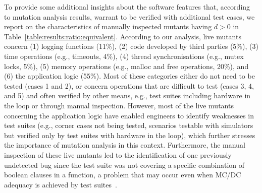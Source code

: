 To provide some additional insights about the software features that, according to \APPR mutation analysis results,
warrant to be verified with additional test cases, we report on the characteristics of
manually inspected mutants having $d > 0$ in Table~\ref{table:results:ratio:equivalent}.
According to our analysis, live mutants concern (1) logging functions (11\%),  (2) code developed by third parties (5\%), (3) time operations (e.g., timeouts, 4\%), (4) thread synchronisations (e.g., mutex locks, 5\%), (5) memory operations (e.g., malloc and free operations, 20\%), and (6) the application logic (55\%). Most of these categories either do not need to be tested (cases 1 and 2), or concern operations that are difficult to test (cases 3, 4, and 5) and often verified by other means, e.g., test suites including hardware in the loop or through manual inspection. However, most of the live mutants concerning the application logic have enabled engineers to identify weaknesses  in test suites
(e.g., corner cases not being tested, scenarios testable with simulators but verified only by test suites with hardware in the loop),
which further stresses the importance of mutation analysis in this context.
Furthermore, the manual inspection of these live mutants led to the identification of
one previously undetected bug
 {since the test suite was not covering a specific combination of boolean clauses in a function, a problem that may occur even when MC/DC adequacy is achieved by test suites~\cite{Gay2016}.}


%

